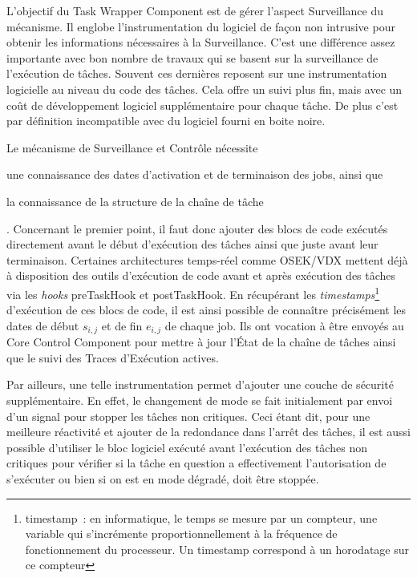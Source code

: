 \documentclass[french, a4paper, 11pt, twoside, pdftex]{StyleThese}
\begin{document}
        L'objectif du Task Wrapper Component est de gérer l'aspect Surveillance du mécanisme. Il englobe l'instrumentation du logiciel de façon non intrusive pour obtenir les informations nécessaires à la Surveillance. C'est une différence assez importante avec bon nombre de travaux qui se basent sur la surveillance de l'exécution de tâches. Souvent ces dernières reposent sur une instrumentation logicielle au niveau du code des tâches. Cela offre un suivi plus fin, mais avec un coût de développement logiciel supplémentaire pour chaque tâche. De plus c'est par définition incompatible avec du logiciel fourni en boite noire.
        
        Le mécanisme de Surveillance et Contrôle nécessite \begin{enumerate*}[label=\bfseries\alph*)]
        	\item une connaissance des dates d'activation et de terminaison des jobs, ainsi que 
        	\item la connaissance de la structure de la chaîne de tâche
        \end{enumerate*}. Concernant le premier point, il faut donc ajouter des blocs de code exécutés directement avant le début d'exécution des tâches ainsi que juste avant leur terminaison. Certaines architectures temps-réel comme OSEK/VDX mettent déjà à disposition des outils d'exécution de code avant et après exécution des tâches via les \textit{hooks} preTaskHook et postTaskHook. En récupérant les \textit{timestamps}\footnote{timestamp~: en informatique, le temps se mesure par un compteur, une variable qui s'incrémente proportionnellement à la fréquence de fonctionnement du processeur. Un timestamp correspond à un horodatage sur ce compteur} d'exécution de ces blocs de code, il est ainsi possible de connaître précisément les dates de début $s_{i,j}$ et de fin $e_{i,j}$ de chaque job. Ils ont vocation à être envoyés au Core Control Component pour mettre à jour l'État de la chaîne de tâches ainsi que le suivi des Traces d'Exécution actives.
        
        Par ailleurs, une telle instrumentation permet d'ajouter une couche de sécurité supplémentaire. En effet, le changement de mode se fait initialement par envoi d'un signal pour stopper les tâches non critiques. Ceci étant dit, pour une meilleure réactivité et ajouter de la redondance dans l'arrêt des tâches, il est aussi possible d'utiliser le bloc logiciel exécuté avant l'exécution des tâches non critiques pour vérifier si la tâche en question a effectivement l'autorisation de s'exécuter ou bien si on est en mode dégradé, doit être stoppée. 
        
\end{document}
